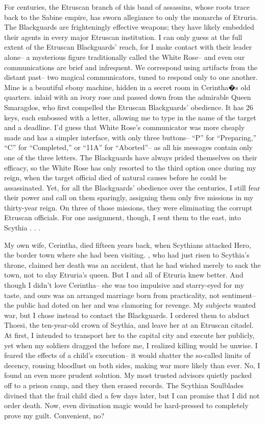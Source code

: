 \documentclass[char]{Kos}
\begin{document}
For centuries, the Etruscan branch of this band of assassins, whose roots trace back to the Sabine empire, has sworn allegiance to only the monarchs of Etruria. The Blackguards are frighteningly effective weapons; they have likely embedded their agents in every major Etruscan institution. I can only guess at the full extent of the Etruscan Blackguards' reach, for I make contact with their leader alone-- a mysterious figure traditionally called the White Rose-- and even our communications are brief and infrequent. We correspond using artifacts from the distant past-- two magical communicators, tuned to respond only to one another. Mine is a beautiful ebony machine, hidden in a secret room in Cerintha�s old quarters. inlaid with an ivory rose and passed down from the admirable Queen Smaragdos, who first compelled the Etruscan Blackguards' obedience. It has 26 keys, each embossed with a letter, allowing me to type in the name of the target and a deadline. I'd guess that White Rose's communicator was more cheaply made and has a simpler interface, with only three buttons-- ``P'' for ``Preparing,'' ``C'' for ``Completed,'' or ``11A'' for ``Aborted''-- as all his messages contain only one of the three letters. The Blackguards have always prided themselves on their efficacy, so the White Rose has only resorted to the third option once during my reign, when the target official died of natural causes before he could be assassinated. Yet, for all the Blackguards' obedience over the centuries, I still fear their power and call on them sparingly, assigning them only five missions in my thirty-year reign. On three of those missions, they were eliminating the corrupt Etruscan officials. For one assignment, though, I sent them to the east, into Scythia . . .

My own wife, Cerintha, died fifteen years back, when Scythians attacked Hero, the border town where she had been visiting. \cScythiaKing{\Monarch} \cScythiaKing{}, who had just risen to Scythia's throne, claimed her death was an accident, that he had wished merely to sack the town, not to slay Etruria's queen. But I and all of Etruria knew better. And though I didn't love Cerintha-- she was too impulsive and starry-eyed for my taste, and ours was an arranged marriage born from practicality, not sentiment-- the public had doted on her and was clamoring for revenge. My subjects wanted war, but I chose instead to contact the Blackguards. I ordered them to abduct Thoesi, the ten-year-old crown \cFugitive{\prince} of Scythia, and leave her at an Etruscan citadel. At first, I intended to transport her to the capital city and execute her publicly, yet when my soldiers dragged the \cFugitive{\kid} before me, I realized killing \cFugitive{\them} would be unwise. I feared the effects of a child's execution-- it would shatter the so-called limits of decency, rousing bloodlust on both sides, making war more likely than ever. No, I found an even more prudent solution. My most trusted advisors quietly packed \cFugitive{\them} off to a prison camp, and they then erased \cFugitive{\their} records. The Scythian Soulblades divined that the frail child died a few days later, but I can promise that I did not order \cFugitive{\their} death. Now, even divination magic would be hard-pressed to completely prove my guilt. Convenient, no?
\end{document}
